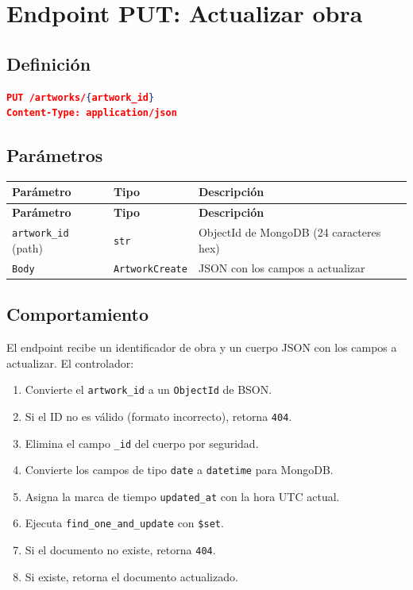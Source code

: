 \documentclass[12pt,a4paper]{article}
\begin{document}
\section{Endpoint PUT: Actualizar obra}

\subsection{Definición}

\begin{lstlisting}[language=json]
PUT /artworks/{artwork_id}
Content-Type: application/json
\end{lstlisting}

\subsection{Parámetros}

\begin{longtable}{lll}
\toprule
\textbf{Parámetro} & \textbf{Tipo} & \textbf{Descripción} \\
\midrule
\endfirsthead
\toprule
\textbf{Parámetro} & \textbf{Tipo} & \textbf{Descripción} \\
\midrule
\endhead
\bottomrule
\endfoot
\texttt{artwork\_id} (path) & \texttt{str} & ObjectId de MongoDB (24 caracteres hex) \\
\texttt{Body} & \texttt{ArtworkCreate} & JSON con los campos a actualizar \\
\bottomrule
\end{longtable}

\subsection{Comportamiento}

El endpoint recibe un identificador de obra y un cuerpo JSON con los campos
a actualizar. El controlador:

\begin{enumerate}
    \item Convierte el \texttt{artwork\_id} a un \texttt{ObjectId} de BSON.
    \item Si el ID no es válido (formato incorrecto), retorna \texttt{404}.
    \item Elimina el campo \texttt{\_id} del cuerpo por seguridad.
    \item Convierte los campos de tipo \texttt{date} a \texttt{datetime} para MongoDB.
    \item Asigna la marca de tiempo \texttt{updated\_at} con la hora UTC actual.
    \item Ejecuta \texttt{find\_one\_and\_update} con \texttt{\$set}.
    \item Si el documento no existe, retorna \texttt{404}.
    \item Si existe, retorna el documento actualizado.
\end{enumerate}
\end{document}
